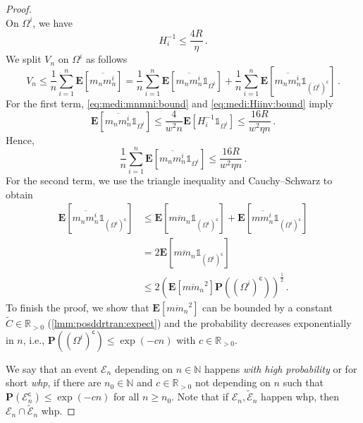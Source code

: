 \documentclass{article}
\newcommand*{\mc}[1]{\mathcal{#1}}
\newcommand{\N}{\mathbb{N}}
\newcommand{\R}{\mathbb{R}}
\newcommand{\Rpp}{\R_{>0}}
\newcommand{\lab}{\left[} %
\newcommand{\rab}{\right]} %
\newcommand{\ab}[1]{\lab #1 \rab} %
\newcommand{\abOf}[1]{\!\ab{#1}} %
\newcommand{\lb}{\left(} %
\newcommand{\rb}{\right)} %
\newcommand{\br}[1]{\lb #1 \rb} %
\newcommand{\brOf}[1]{\!\br{#1}} %
\renewcommand{\Pr}{\mathbf{P}} %
\newcommand{\Prof}[1]{\Pr(#1)}
\newcommand{\PrOf}[1]{\Pr\brOf{#1}}
\newcommand{\E}{\mathbf{E}} %
\newcommand{\Eof}[1]{\E[#1]}
\newcommand{\EOf}[1]{\E\abOf{#1}}
\newcommand{\compl}{^\mathsf{c}}%
\newcommand{\ind}{\mathds{1}}%
\newcommand{\eqfs}{\,.}
\newcommand{\ol}[2]{\overline{#1#2}}
\begin{document}
\begin{proof}
\begin{equation}
    \end{equation}
    On $\Omega^i$, we have
    \begin{equation}\label{eq:medi:Hiinv:bound}
        H_i^{-1} \leq
        \frac {4R}{\eta}
        \eqfs
    \end{equation}
    We split $V_n$ on $\Omega^i$ as follows
    \begin{equation}
        V_n
        \leq 
        \frac 1{n}\sum_{i=1}^n \EOf{\ol{m_n}{m_n^{i}}}
        =
        \frac 1{n}\sum_{i=1}^n \EOf{\ol{m_n}{m_n^{i}} \ind_{\Omega^i}}
        +
        \frac 1{n}\sum_{i=1}^n \EOf{\ol{m_n}{m_n^{i}} \ind_{(\Omega^i)\compl}}
        \eqfs
    \end{equation}
    For the first term, \eqref{eq:medi:mnmni:bound} and \eqref{eq:medi:Hiinv:bound} imply
    \begin{equation}
        \EOf{\ol{m_n}{m_n^{i}} \ind_{\Omega^i}}
        \leq 
        \frac{4}{w^2 n}\EOf{H_i^{-1} \ind_{\Omega^i}}
        \leq 
        \frac{16R}{w^2 \eta n}
        \eqfs
    \end{equation}
    Hence, 
    \begin{equation}
        \frac 1{n}\sum_{i=1}^n \EOf{\ol{m_n}{m_n^{i}} \ind_{\Omega^i}}
        \leq
        \frac{16R}{w^2 \eta n}
        \eqfs
    \end{equation}
    For the second term, we use the triangle inequality and Cauchy--Schwarz to obtain
    \begin{align}
        \EOf{\ol{m_n}{m_n^{i}} \ind_{(\Omega^i)\compl}}
        &\leq 
        \EOf{\ol{m}{m_n} \ind_{(\Omega^i)\compl}}
        +
        \EOf{\ol{m}{m_n^{i}} \ind_{(\Omega^i)\compl}}
        \\&=
        2 \EOf{\ol{m}{m_n} \ind_{(\Omega^i)\compl}}
        \\&\leq 
        2 \br{\EOf{\ol{m}{m_n}^2} \PrOf{(\Omega^i)\compl}}^{\frac12}
        \eqfs
    \end{align}
    To finish the proof, we show that $\Eof{\ol{m}{m_n}^2}$ can be bounded by a constant $\tilde C\in\Rpp$ (\cref{lmm:posddrtran:expect}) and the probability decreases exponentially in $n$, i.e., $\Prof{(\Omega^i)\compl} \leq \exp(-cn)$ with $c\in\Rpp$.
    
    We say that an event $\mc E_n$ depending on $n\in\N$ happens \emph{with high probability} or for short \emph{whp}, if there are $n_0 \in\N$ and $c \in \Rpp$ not depending on $n$ such that $\Prof{\mc E_n\compl} \leq \exp(-c n)$ for all $n \geq n_0$. Note that if $\mc E_n, \tilde{\mc E}_n$ happen whp, then $\mc E_n \cap\tilde{\mc E}_n$ whp.
    

\end{proof}
\end{document}
